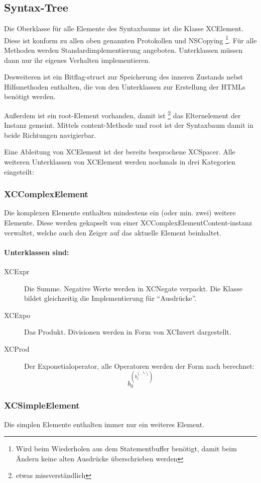 \subsection{Syntax-Tree}
Die Oberklasse für alle Elemente des Syntaxbaums ist die Klasse XCElement.
Diese ist konform zu allen oben genannten Protokollen und NSCopying \footnote{Wird beim Wiederholen aus dem Statementbuffer benötigt, damit beim Ändern keine alten Ausdrücke überschrieben werden}. Für alle Methoden werden Standardimplementierung angeboten. Unterklassen müssen dann nur ihr eigenes Verhalten implementieren.

Desweiteren ist ein Bitflag-struct zur Speicherung des inneren Zustands nebst Hilfsmethoden enthalten, die von den Unterklassen zur Erstellung der HTMLs benötigt werden.

Außerdem ist ein root-Element vorhanden, damit ist \footnote{etwas missverständlich} das Elternelement der Instanz gemeint. Mittels content-Methode und root ist der Syntaxbaum damit in beide Richtungen navigierbar.

Eine Ableitung von XCElement ist der bereits besprochene XCSpacer.
Alle weiteren Unterklassen von XCElement werden nochmals in drei Kategorien eingeteilt:

\subsubsection{XCComplexElement}
Die komplexen Elemente enthalten mindestens ein (oder min. zwei) weitere Elemente.
Diese werden gekapselt von einer XCComplexElementContent-instanz verwaltet, welche auch den Zeiger auf das aktuelle Element beinhaltet.

\paragraph{Unterklassen sind:} 
\begin{description}
	\item[XCExpr] Die Summe. Negative Werte werden in XCNegate verpackt.
		Die Klasse bildet gleichzeitig die Implementierung für ``Ausdrücke''.
	\item[XCExpo] Das Produkt. Divisionen werden in Form von XCInvert dargestellt.
	\item[XCProd] Der Exponetialoperator, alle Operatoren werden der Form nach berechnet:
		\[b_0^{(b_1^{(\ldots^{b_n})})} \]
\end{description}
\subsubsection{XCSimpleElement}
Die simplen Elemente enthalten immer nur ein weiteres Element.

